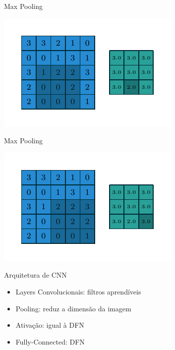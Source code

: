 \documentclass[10pt]{beamer}
\begin{document}
\begin{frame}{Max Pooling}
\begin{center}
\includegraphics[scale=1.5]{images/numerical_max_pooling_07.pdf}
\end{center}
\end{frame}

\begin{frame}{Max Pooling}
\begin{center}
\includegraphics[scale=1.5]{images/numerical_max_pooling_08.pdf}
\end{center}
\end{frame}

\begin{frame}[fragile]{Arquitetura de CNN}
\begin{center}

\end{center}
\begin{itemize}
	\item Layers Convolucionais: filtros aprendíveis
    \vspace{1em}
    \item Pooling: reduz a dimensão da imagem
    \vspace{1em}
    \item Ativação: igual à DFN
    \vspace{1em}
    \item Fully-Connected: DFN 
\end{itemize}
\end{frame}
\end{document}
